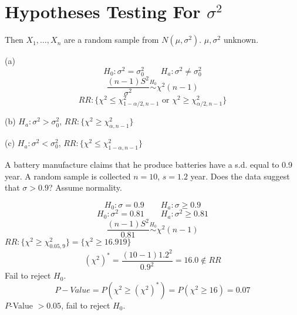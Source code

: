\section{Hypotheses Testing For $\sigma^2$}
Then $X_1,\dots,X_n$ are a random sample from $N(\mu,\sigma^2)$. $\mu,\sigma^2$ unknown.

(a)\[H_0:\sigma^2=\sigma_0^2 \qquad H_a:\sigma^2 \neq\sigma_0^2\]
\[\frac{(n-1)S^2}{\sigma^2} \overset{H_0}{\sim} \chi^2(n-1)\]
\[RR:\{\chi^2 \leq \chi^2_{1-\alpha/2,n-1} \text{ or } \chi^2 \geq \chi^2_{\alpha/2,n-1}\}\]

(b) $H_a:\sigma^2 >\sigma_0^2$, $RR:\{\chi^2 \geq \chi^2_{\alpha,n-1}\}$

(c) $H_a:\sigma^2 <\sigma_0^2$, $RR:\{\chi^2 \leq \chi^2_{1-\alpha,n-1}\}$

\begin{exmp}
A battery manufacture claims that he produce batteries have a s.d. equal to 0.9 year. A random sample is collected $n=10$, $s=1.2$ year. Does the data suggest that $\sigma>0.9$? Assume normality.

\[H_0:\sigma=0.9 \qquad H_a:\sigma \geq 0.9\]
\[H_0:\sigma^2=0.81 \qquad H_a:\sigma^2 \geq 0.81\]
\[\frac{(n-1)S^2}{0.81} \overset{H_0}{\sim} \chi^2(n-1)\]
$RR:\{\chi^2 \geq \chi^2_{0.05,9}\}=\{\chi^2 \geq 16.919\}$
\[(\chi^2)^*=\frac{(10-1)1.2^2}{0.9^2}=16.0 \notin RR \]
Fail to reject $H_0$.
\[P-Value=P(\chi^2\geq (\chi^2)^* )=P(\chi^2\geq  16)=0.07\]
$P$-Value $>0.05$, fail to reject $H_0$.
\end{exmp}